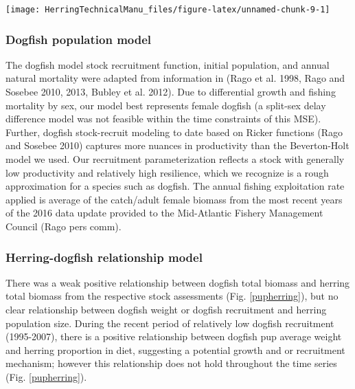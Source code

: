 \documentclass[]{article}
\let\origfigure\figure
\let\endorigfigure\endfigure
\renewenvironment{figure}[1][2] {
    \expandafter\origfigure\expandafter[H]
} {
    \endorigfigure
}
\begin{document}
\begin{figure}

{\centering \texttt{[image: HerringTechnicalManu\_files/figure-latex/unnamed-chunk-9-1]} 

}

\caption{Relationship of assessed groundfish spawning stock biomass (SSB) with the proportion of herring in diet \label{gfishBherrdiet}}\label{fig:unnamed-chunk-9}
\end{figure}

\subsubsection{Dogfish population model}\label{dogfish-population-model}

The dogfish model stock recruitment function, initial population, and
annual natural mortality were adapted from information in (Rago et al.
1998, Rago and Sosebee 2010, 2013, Bubley et al. 2012). Due to
differential growth and fishing mortality by sex, our model best
represents female dogfish (a split-sex delay difference model was not
feasible within the time constraints of this MSE). Further, dogfish
stock-recruit modeling to date based on Ricker functions (Rago and
Sosebee 2010) captures more nuances in productivity than the
Beverton-Holt model we used. Our recruitment parameterization reflects a
stock with generally low productivity and relatively high resilience,
which we recognize is a rough approximation for a species such as
dogfish. The annual fishing exploitation rate applied is average of the
catch/adult female biomass from the most recent years of the 2016 data
update provided to the Mid-Atlantic Fishery Management Council (Rago
pers comm).

\subsubsection{Herring-dogfish relationship
model}\label{herring-dogfish-relationship-model}

There was a weak positive relationship between dogfish total biomass and
herring total biomass from the respective stock assessments (Fig.
\ref{pupherring}), but no clear relationship between dogfish weight or
dogfish recruitment and herring population size. During the recent
period of relatively low dogfish recruitment (1995-2007), there is a
positive relationship between dogfish pup average weight and herring
proportion in diet, suggesting a potential growth and or recruitment
mechanism; however this relationship does not hold throughout the time
series (Fig. \ref{pupherring}).
\end{document}
